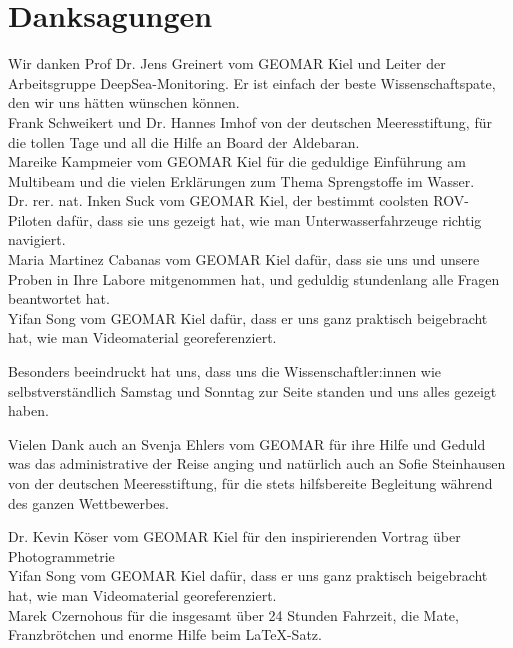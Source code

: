  

\chapter[Danksagungen]{Danksagungen}
Wir danken Prof Dr. Jens Greinert vom GEOMAR Kiel und Leiter der Arbeitsgruppe DeepSea-Monitoring. Er ist einfach der beste Wissenschaftspate, den wir uns hätten wünschen können.\\


Frank Schweikert und Dr. Hannes Imhof von der deutschen Meeresstiftung, für die tollen Tage und all die Hilfe an Board der Aldebaran. \\


Mareike Kampmeier vom GEOMAR Kiel für die geduldige Einführung am Multibeam und die vielen Erklärungen zum Thema Sprengstoffe im Wasser. \\


Dr. rer. nat. Inken Suck vom GEOMAR Kiel, der bestimmt coolsten ROV-Piloten dafür, dass sie uns gezeigt hat, wie man Unterwasserfahrzeuge richtig navigiert. \\


Maria Martinez Cabanas vom GEOMAR Kiel dafür, dass sie uns und unsere Proben in Ihre Labore mitgenommen hat, und geduldig stundenlang alle Fragen beantwortet hat.\\



Yifan Song vom GEOMAR Kiel dafür, dass er uns ganz praktisch beigebracht hat, wie man Videomaterial georeferenziert.

Besonders beeindruckt hat uns, dass uns die Wissenschaftler:innen wie selbstverständlich Samstag und Sonntag zur Seite standen und uns alles gezeigt haben.

Vielen Dank auch an Svenja Ehlers vom GEOMAR für ihre Hilfe und Geduld was das administrative der Reise anging und natürlich auch an Sofie Steinhausen von der deutschen Meeresstiftung, für die stets hilfsbereite Begleitung während des ganzen Wettbewerbes.


Dr. Kevin Köser vom GEOMAR Kiel für den inspirierenden Vortrag über Photogrammetrie \\


Yifan Song vom GEOMAR Kiel dafür, dass er uns ganz praktisch beigebracht hat, wie man Videomaterial georeferenziert.\\

Marek Czernohous für die insgesamt über 24 Stunden Fahrzeit, die Mate, Franzbrötchen und enorme Hilfe beim \LaTeX -Satz.\\


